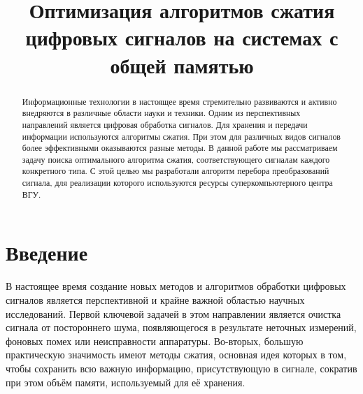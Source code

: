 \documentclass[11pt, oneside, a4paper]{article}
\begin{document}

\title{Оптимизация алгоритмов сжатия цифровых сигналов на системах с общей памятью}


\begin{abstract}
Информационные технологии в настоящее время стремительно развиваются и активно внедряются в различные области науки и техники. Одним из перспективных направлений является цифровая обработка сигналов. Для хранения и передачи информации используются алгоритмы сжатия. При этом для различных видов сигналов более эффективными оказываются  разные методы. В данной работе мы рассматриваем задачу поиска оптимального алгоритма сжатия, соответствующего сигналам каждого конкретного типа. С этой целью мы разработали алгоритм перебора преобразований сигнала, для реализации которого используются ресурсы суперкомпьютерного центра ВГУ.
\end{abstract}



\section{Введение}

В настоящее время создание новых методов и алгоритмов обработки цифровых сигналов является перспективной и крайне важной областью научных исследований. Первой ключевой задачей в этом направлении является очистка сигнала от постороннего шума, появляющегося в результате неточных измерений, фоновых помех или неисправности аппаратуры. Во-вторых, большую практическую значимость имеют методы сжатия, основная идея которых в том, чтобы сохранить всю важную информацию, присутствующую в сигнале, сократив при этом объём памяти, используемый для её хранения.
\end{document}
